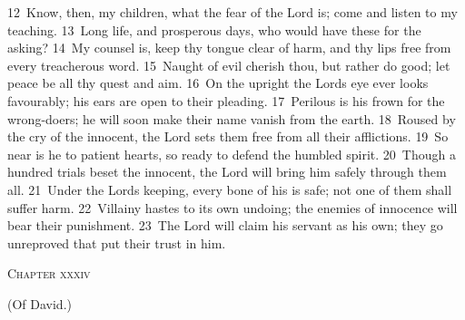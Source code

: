 \documentclass[10pt]{book} %
\begin{document}
\textcolor{benred8}{12}~Know, then, my children, what the fear of the Lord is; come and listen to my teaching. \textcolor{benred8}{13}~Long life, and prosperous days, who would have these for the asking? \textcolor{benred8}{14}~My counsel is, keep thy tongue clear of harm, and thy lips free from every treacherous word. \textcolor{benred8}{15}~Naught of evil cherish thou, but rather do good; let peace be all thy quest and aim. \textcolor{benred8}{16}~On the upright the Lord\textquotesingle s eye ever looks favourably; his ears are open to their pleading. \textcolor{benred8}{17}~Perilous is his frown for the wrong-doers; he will soon make their name vanish from the earth. \textcolor{benred8}{18}~Roused by the cry of the innocent, the Lord sets them free from all their afflictions. \textcolor{benred8}{19}~So near is he to patient hearts, so ready to defend the humbled spirit. \textcolor{benred8}{20}~Though a hundred trials beset the innocent, the Lord will bring him safely through them all. \textcolor{benred8}{21}~Under the Lord\textquotesingle s keeping, every bone of his is safe; not one of them shall suffer harm. \textcolor{benred8}{22}~Villainy hastes to its own undoing; the enemies of innocence will bear their punishment.
\textcolor{benred8}{23}~The Lord will claim his servant as his own; they go unreproved that put their trust in him.
\begin{large}\begin{center}\textsc{Chapter xxxiv}\end{center}\end{large}
(Of David.)
\end{document}
